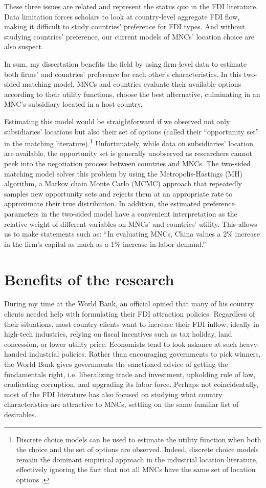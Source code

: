These three issues are related and represent the status quo in the FDI
literature. Data limitation forces scholars to look at country-level aggregate
FDI flow, making it difficult to study countries' preference for FDI types. And
without studying countries' preference, our current models of MNCs' location
choice are also suspect.

In sum, my dissertation benefits the field by using firm-level data to estimate
both firms' and countries' preference for each other's characteristics. In this
two-sided matching model, MNCs and countries evaluate their available options
according to their utility functions, choose the best alternative, culminating
in an MNC's subsidiary located in a host country.

Estimating this model would be straightforward if we observed not only
subsidiaries' locations but also their set of options (called their
``opportunity set'' in the matching literature).\footnote{Discrete choice models
  can be used to estimate the utility function when both the choice and the set
  of options are observed. Indeed, discrete choice models remain the dominant
  empirical approach in the industrial location literature, effectively ignoring
  the fact that not all MNCs have the same set of location options
  \citep{Arauzo-Carod2010}.} Unfortunately, while data on subsidiaries' location
are available, the opportunity set is generally unobserved as researchers cannot
peek into the negotiation process between countries and MNCs. The two-sided
matching model solves this problem by using the Metropolis-Hastings (MH)
algorithm, a Markov chain Monte Carlo (MCMC) approach that repeatedly samples
new opportunity sets and rejects them at an appropriate rate to approximate
their true distribution. In addition, the estimated preference parameters in the
two-sided model have a convenient interpretation as the relative weight of
different variables on MNCs' and countries' utility. This allows us to make
statements such as: ``In evaluating MNCs, China values a 2\% increase in the
firm's capital as much as a 1\% increase in labor demand.''

\section{Benefits of the research}

During my time at the World Bank, an official opined that many of his country
clients needed help with formulating their FDI attraction policies. Regardless
of their situations, most country clients want to increase their FDI inflow, ideally in high-tech industries, relying on fiscal incentives such as tax holiday, land
concession, or lower utility price. Economists tend to look askance at such
heavy-handed industrial policies. Rather than encouraging governments to pick
winners, the World Bank gives governments the sanctioned advice of getting the
fundamentals right, i.e. liberalizing trade and investment, upholding rule of
law, eradicating corruption, and upgrading its labor force. Perhaps not
coincidentally, most of the FDI literature has also focused on studying what
country characteristics are attractive to MNCs, settling on the same familiar
list of desirables.

